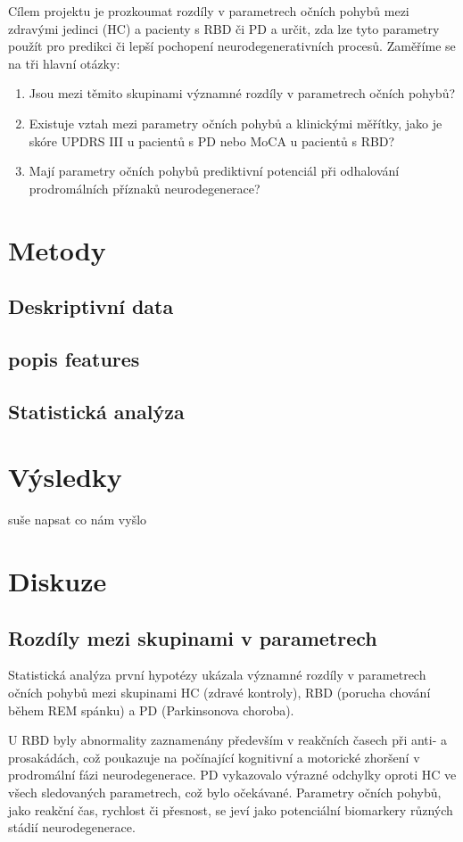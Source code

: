 \documentclass{article}
\begin{document}
Cílem projektu je prozkoumat rozdíly v parametrech očních pohybů mezi zdravými jedinci (HC) a pacienty s RBD či PD a určit, zda lze tyto parametry použít pro predikci či lepší pochopení neurodegenerativních procesů. Zaměříme se na tři hlavní otázky:
\begin{enumerate}
    \item Jsou mezi těmito skupinami významné rozdíly v parametrech očních pohybů?
    \item Existuje vztah mezi parametry očních pohybů a klinickými měřítky, jako je skóre UPDRS III u pacientů s PD nebo MoCA u pacientů s RBD?
    \item Mají parametry očních pohybů prediktivní potenciál při odhalování prodromálních příznaků neurodegenerace?
\end{enumerate}

\section{Metody}
\subsection{Deskriptivní data}
\subsection{popis features}
\subsection{Statistická analýza}
\section{Výsledky}

suše napsat co nám vyšlo
\section{Diskuze}
\subsection{Rozdíly mezi skupinami v parametrech}
Statistická analýza první hypotézy ukázala významné rozdíly v parametrech očních pohybů mezi skupinami HC (zdravé kontroly), RBD (porucha chování během REM spánku) a PD (Parkinsonova choroba).

U RBD byly abnormality zaznamenány především v reakčních časech při anti- a prosakádách, což poukazuje na počínající kognitivní a motorické zhoršení v prodromální fázi neurodegenerace. PD vykazovalo výrazné odchylky oproti HC ve všech sledovaných parametrech, což bylo očekávané. Parametry očních pohybů, jako reakční čas, rychlost či přesnost, se jeví jako potenciální biomarkery různých stádií neurodegenerace.
\end{document}
